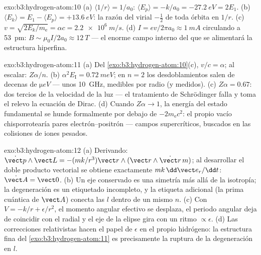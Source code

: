 \begin{solution}{exo:b3:hydrogen-atom:10}
(a) $\langle 1/r\rangle = 1/a_0$: $\langle E_p\rangle = -k/a_0 =
\qty{-27.2}{eV} = 2E_1$. (b) $\langle E_k\rangle = E_1 - \langle
E_p\rangle = +\qty{13.6}{eV}$: la razón del virial $-\tfrac12$ de
toda órbita en $1/r$. (c) $v = \sqrt{2E_k/m_{\text{e}}} = \alpha c =
\qty{2.2e6}{m/s}$. (d) $I = ev/2\pi a_0 \approx \qty{1}{mA}$
circulando a \qty{53}{pm}: $B \sim \mu_0I/2a_0 \approx
\qty{12}{T}$ --- el enorme campo interno del que se alimentará la
estructura hiperfina.
\end{solution}

\begin{solution}{exo:b3:hydrogen-atom:11}
(a) Del \cref{exo:b3:hydrogen-atom:10}(c), $v/c = \alpha$;
al escalar: $Z\alpha/n$. (b) $\alpha^2E_{\text{I}} = \qty{0.72}{meV}$;
en $n = 2$ los desdoblamientos salen de decenas de $\unit{\micro eV}$ ---
unos \qty{10}{GHz}, medibles por radio (y medidos). (c) $Z\alpha =
0.67$: dos tercios de la velocidad de la luz --- el tratamiento de
Schrödinger falla y toma el relevo la ecuación de Dirac. (d) Cuando
$Z\alpha \to 1$, la energía del estado fundamental se hunde formalmente por
debajo de $-2m_{\text{e}}c^2$: el propio vacío chisporrotearía pares
electrón--positrón --- campos supercríticos, buscados en las colisiones de
iones pesados.
\end{solution}

\begin{solution}{exo:b3:hydrogen-atom:12}
(a) Derivando: $\dot{\vect p}\wedge\vect L = -(mk/r^3)\vect
r\wedge(\vect r\wedge\dot{\vect r}\,m)$; al desarrollar el doble producto
vectorial se obtiene exactamente $mk\,\dd\vect e_r/\dd t$: $\dot{\vect A} =
\vect 0$. (b) Un eje conservado es una simetría más allá de la isotropía;
la degeneración es un etiquetado incompleto, y la etiqueta adicional (la
prima cuántica de $\vect
A$) conecta las $l$ dentro de un mismo $n$. (c) Con
$V = -k/r + \epsilon/r^2$, el momento angular efectivo se desplaza,
el periodo angular deja de coincidir con el radial y el eje de la
elipse gira con un ritmo $\propto\epsilon$. (d) Las correcciones
relativistas hacen el papel de $\epsilon$ en el propio hidrógeno: la
estructura fina del \cref{exo:b3:hydrogen-atom:11} es precisamente la
ruptura de la degeneración en $l$.
\end{solution}

